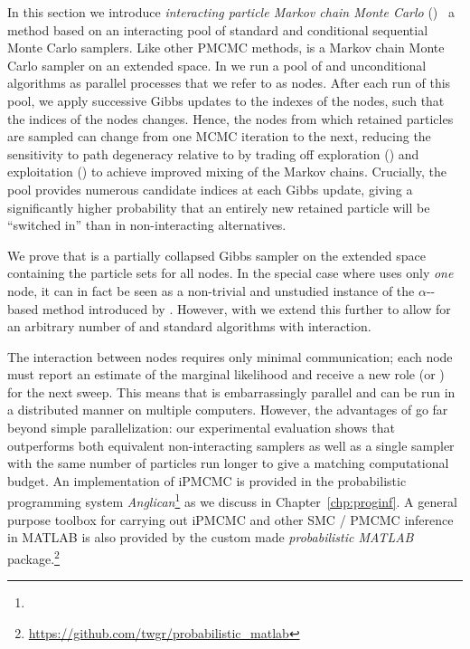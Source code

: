 
In this section we introduce \emph{interacting particle Markov chain Monte Carlo} (\ipmcmc)~\citep{rainforth2016interacting}
a \pmcmc method based on an interacting pool of standard and conditional sequential Monte Carlo samplers. Like 
other PMCMC methods, \ipmcmc is a Markov chain Monte Carlo sampler on an extended space. In \ipmcmc we run a pool of 
\csmc and unconditional \smc algorithms as parallel processes that we refer to as nodes. After each run of this pool, 
we apply successive Gibbs updates to the indexes of the \csmc nodes, such that the indices of the \csmc nodes changes. 
Hence, the nodes from which retained particles are sampled can change from one MCMC iteration to the next, reducing
the sensitivity to path degeneracy relative to \pg 
by trading off exploration (\smc) and exploitation (\csmc) to achieve improved mixing of the Markov chains. Crucially, 
the pool provides numerous candidate indices at each Gibbs update, giving a significantly higher probability that an 
entirely new retained particle will be ``switched in'' than in non-interacting alternatives.

We prove that \ipmcmc is a partially collapsed Gibbs sampler on the extended space containing the particle sets for all nodes. 
In the special case where \ipmcmc uses only \emph{one} \csmc node, it can in fact be seen as a non-trivial and unstudied 
instance of the $\alpha$-\smc-based \citep{whiteley2016} \pmcmc method introduced by \citet{huggins2015}. 
However, with \ipmcmc we extend this further to allow for an arbitrary number of \csmc and standard \smc algorithms 
with interaction.

The interaction between nodes requires only minimal communication; each node must report an estimate of the marginal likelihood 
and receive a new role (\smc or \csmc) for the next sweep. This means that \ipmcmc is embarrassingly parallel 
and can be run in a distributed manner on multiple computers.  However, the advantages of \ipmcmc go far beyond
simple parallelization: our experimental evaluation shows that \ipmcmc outperforms both equivalent
non-interacting \pmcmc samplers as well as a single \pg sampler with the same number of particles run longer
to give a matching computational budget.
An implementation of iPMCMC is provided in the probabilistic programming system
\emph{Anglican}\footnote{\angurl} \citep{wood2014new} as we discuss in Chapter~\ref{chp:proginf}.  A general 
purpose toolbox for carrying out iPMCMC and other SMC / PMCMC inference in MATLAB is also provided by the custom
made \emph{probabilistic MATLAB} package.\footnote{\url{https://github.com/twgr/probabilistic_matlab}}